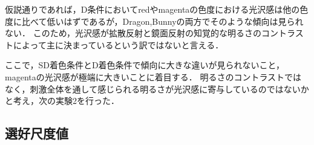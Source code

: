         仮説通りであれば，D条件においてredやmagentaの色度における光沢感は他の色度に比べて低いはずであるが，Dragon,Bunnyの両方でそのような傾向は見られない．
        このため，光沢感が拡散反射と鏡面反射の知覚的な明るさのコントラストによって主に決まっているという訳ではないと言える．

        ここで，SD着色条件とD着色条件で傾向に大きな違いが見られないこと，magentaの光沢感が極端に大きいことに着目する．
        明るさのコントラストではなく，刺激全体を通して感じられる明るさが光沢感に寄与しているのではないかと考え，次の実験2を行った．

    \subsection{選好尺度値}